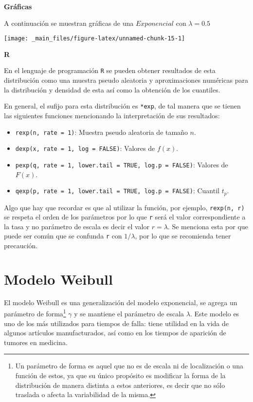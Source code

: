 \documentclass[
  a4paper,
  oneside,
  openany]{book}
\providecommand{\tightlist}{%
  \setlength{\itemsep}{0pt}\setlength{\parskip}{0pt}}
\begin{document}
\textbf{Gráficas}

A continuación se muestran gráficas de una \(Exponencial\) con \(\lambda=0.5\)

\begin{center}\texttt{[image: \_main\_files/figure-latex/unnamed-chunk-15-1]} \end{center}

\textbf{R}

En el lenguaje de programación \texttt{R} se pueden obtener resultados de esta distribución como una muestra pseudo aleatoria y aproximaciones numéricas para la distribución y densidad de esta así como la obtención de los cuantiles.

En general, el sufijo para esta distribución es \texttt{*exp}, de tal manera que se tienen las siguientes funciones mencionando la interpretación de sus resultados:

\begin{itemize}
\tightlist
\item
  \texttt{rexp(n,\ rate\ =\ 1)}: Muestra pseudo aleatoria de tamaño \(n\).
\item
  \texttt{dexp(x,\ rate\ =\ 1,\ log\ =\ FALSE)}: Valores de \(f(x)\).
\item
  \texttt{pexp(q,\ rate\ =\ 1,\ lower.tail\ =\ TRUE,\ log.p\ =\ FALSE)}: Valores de \(F(x)\).
\item
  \texttt{qexp(p,\ rate\ =\ 1,\ lower.tail\ =\ TRUE,\ log.p\ =\ FALSE)}: Cuantil \(t_p\).
\end{itemize}

Algo que hay que recordar es que al utilizar la función, por ejemplo, \texttt{rexp(n,\ r)} se respeta el orden de los parámetros por lo que \texttt{r} será el valor correspondiente a la tasa y no parámetro de escala es decir el valor \(r = \lambda\). Se menciona esta por que puede ser común que se confunda \texttt{r} con \(1/\lambda\), por lo que se recomienda tener precaución.

\hypertarget{modelo-weibull}{%
\section{Modelo Weibull}\label{modelo-weibull}}

El modelo Weibull es una generalización del modelo exponencial, se agrega un parámetro de forma\footnote{Un parámetro de forma es aquel que no es de escala ni de localización o una función de estos, ya que su único propósito es modificar la forma de la distribución de manera distinta a estos anteriores, es decir que no sólo traslada o afecta la variabilidad de la misma.} \(\gamma\) y se mantiene el parámetro de escala \(\lambda\). Este modelo es uno de los más utilizados para tiempos de falla: tiene utilidad en la vida de algunos artículos manufacturados, así como en los tiempos de aparición de tumores en medicina.
\end{document}
